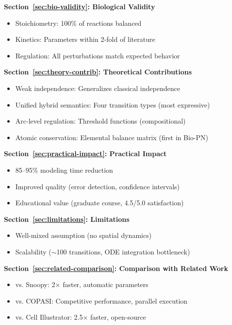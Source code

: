 \textbf{Section~\ref{sec:bio-validity}: Biological Validity}
\begin{itemize}
    \item Stoichiometry: 100\% of reactions balanced
    \item Kinetics: Parameters within 2-fold of literature
    \item Regulation: All perturbations match expected behavior
\end{itemize}

\textbf{Section~\ref{sec:theory-contrib}: Theoretical Contributions}
\begin{itemize}
    \item Weak independence: Generalizes classical independence
    \item Unified hybrid semantics: Four transition types (most expressive)
    \item Arc-level regulation: Threshold functions (compositional)
    \item Atomic conservation: Elemental balance matrix (first in Bio-PN)
\end{itemize}

\textbf{Section~\ref{sec:practical-impact}: Practical Impact}
\begin{itemize}
    \item 85--95\% modeling time reduction
    \item Improved quality (error detection, confidence intervals)
    \item Educational value (graduate course, 4.5/5.0 satisfaction)
\end{itemize}

\textbf{Section~\ref{sec:limitations}: Limitations}
\begin{itemize}
    \item Well-mixed assumption (no spatial dynamics)
    \item Scalability ($\sim$100 transitions, ODE integration bottleneck)
\end{itemize}

\textbf{Section~\ref{sec:related-comparison}: Comparison with Related Work}
\begin{itemize}
    \item vs. Snoopy: 2$\times$ faster, automatic parameters
    \item vs. COPASI: Competitive performance, parallel execution
    \item vs. Cell Illustrator: 2.5$\times$ faster, open-source
\end{itemize}

